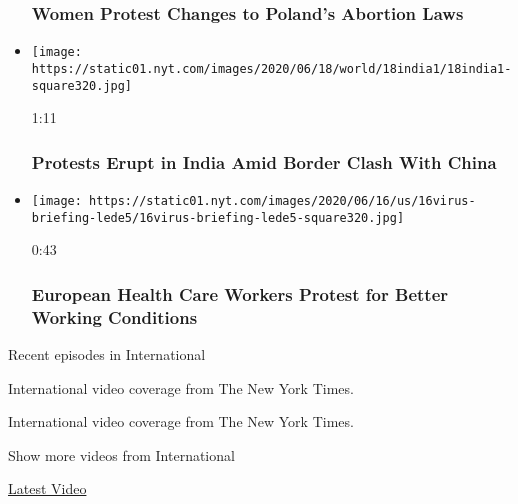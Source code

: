 \begin{itemize}
{  \subsubsection{Women Protest Changes to Poland's Abortion
  Laws}\label{women-protest-changes-to-polands-abortion-laws}}
\item
  \href{https://www.nytimes.com/video/world/asia/100000007197958/anti-china-protests-india.html?action=click\&module=video-series-bar\&region=header\&pgtype=Article\&playlistId=video/world}{}

  \texttt{[image: https://static01.nyt.com/images/2020/06/18/world/18india1/18india1-square320.jpg]}

  1:11

  \hypertarget{protests-erupt-in-india-amid-border-clash-with-china}{%
  \subsubsection{Protests Erupt in India Amid Border Clash With
  China}\label{protests-erupt-in-india-amid-border-clash-with-china}}
\item
  \href{https://www.nytimes.com/video/us/100000007194473/european-health-care-workers-protest-for-better-working-conditions.html?action=click\&module=video-series-bar\&region=header\&pgtype=Article\&playlistId=video/world}{}

  \texttt{[image: https://static01.nyt.com/images/2020/06/16/us/16virus-briefing-lede5/16virus-briefing-lede5-square320.jpg]}

  0:43

  \hypertarget{european-health-care-workers-protest-for-better-working-conditions}{%
  \subsubsection{European Health Care Workers Protest for Better Working
  Conditions}\label{european-health-care-workers-protest-for-better-working-conditions}}
\end{itemize}

Recent episodes in International

International video coverage from The New York Times.

International video coverage from The New York Times.

Show more videos from International

\href{/video}{}

\href{/video/latest-video}{Latest Video}

